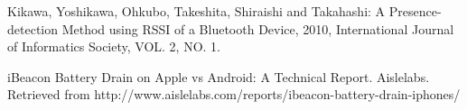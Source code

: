 
%
%
%
\begin{thebibliography}{1}

 Kikawa, Yoshikawa, Ohkubo, Takeshita, Shiraishi and Takahashi:  
 A Presence-detection Method using RSSI of a Bluetooth Device, 2010, International Journal of Informatics Society, VOL. 2, NO. 1. 


iBeacon Battery Drain on Apple vs Android: A Technical Report. Aislelabs. Retrieved from http://www.aislelabs.com/reports/ibeacon-battery-drain-iphones/



\end{thebibliography}
